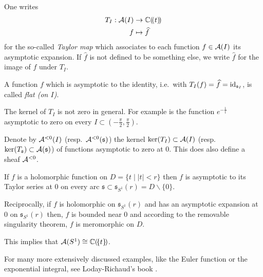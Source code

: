 One writes
\begin{align*}
  T_{I}:\mathcal{A}(I)&\to\mathbb{C}(\!(t)\!)
  \\f&\mapsto\widehat f
\end{align*}
for the so-called \emph{Taylor map} which associates to each function
$f\in\mathcal{A}(I)$ its asymptotic expansion.
If $\hat f$ is not defined to be something else, we write $\hat f$ for the image
of $f$ under $T_{I}$.
\begin{defn}
  A function $f$ which is asymptotic to the identity, i.e.\ with
  $T_{I}(f)=\widehat f=\operatorname{id}_{\mathfrak{s}_I}$, is called \emph{flat (on $I$)}.
\end{defn}

The kernel of $T_{I}$ is not zero in general.
For example is the function $e^{-\frac{1}{t}}$ asymptotic to zero on every
$I\subset\left(-\frac{\pi}{2},\frac{\pi}{2}\right)$.
\begin{defn}
  Denote by $\mathcal{A}^{<0}(I)$ (resp.\ $\mathcal{A}^{<0}(\mathfrak{s})$) the kernel
  $\ker(T_{I})\subset\mathcal{A}(I)$ (resp.\
  $\ker(T_{\mathfrak{s}})\subset\mathcal{A}(\mathfrak{s})$) of functions asymptotic to
  zero at $0$.
  This does also define a sheaf $\mathcal{A}^{<0}$.
\end{defn}

\begin{exmp}
  If $f$ is a holomorphic function on $D=\{t\mid |t|<r\}$ then $f$ is asymptotic
  to its Taylor series at $0$ on every arc
  $\mathfrak{s}\subset\mathfrak{s}_{S^1}(r)=D\backslash\{0\}$.

  Reciprocally, if $f$ is holomorphic on $\mathfrak{s}_{S^1}(r)$ and has an
  asymptotic expansion at $0$ on $\mathfrak{s}_{S^1}(r)$ then, $f$ is bounded
  near $0$ and according to the removable singularity theorem, $f$ is
  meromorphic on $D$.
  \begin{s-rem}
    This implies that $\mathcal{A}(S^1)\cong\mathbb{C}(\!\{t\}\!)$.
  \end{s-rem}
\end{exmp}
For many more extensively discussed examples, like the Euler function or the
exponential integral, see Loday-Richaud's book \cite[Sec.2.2]{Loday2014}.

